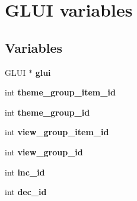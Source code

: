 \hypertarget{group___g_l_u_i___v_a_r_i_a_b_l_e_s}{\section{G\-L\-U\-I variables}
\label{group___g_l_u_i___v_a_r_i_a_b_l_e_s}
}
\subsection*{Variables}
\begin{DoxyCompactItemize}
\item 
\hypertarget{group___g_l_u_i___v_a_r_i_a_b_l_e_s_gab9d60a234f3204b269616cd65d6365a7}{G\-L\-U\-I $\ast$ {\bfseries glui}}\label{group___g_l_u_i___v_a_r_i_a_b_l_e_s_gab9d60a234f3204b269616cd65d6365a7}

\item 
\hypertarget{group___g_l_u_i___v_a_r_i_a_b_l_e_s_ga9cbd400ce6f3b08890a6409078083914}{int {\bfseries theme\-\_\-group\-\_\-item\-\_\-id}}\label{group___g_l_u_i___v_a_r_i_a_b_l_e_s_ga9cbd400ce6f3b08890a6409078083914}

\item 
\hypertarget{group___g_l_u_i___v_a_r_i_a_b_l_e_s_ga44d116ceeb353331a9e402c0a2d085fe}{int {\bfseries theme\-\_\-group\-\_\-id}}\label{group___g_l_u_i___v_a_r_i_a_b_l_e_s_ga44d116ceeb353331a9e402c0a2d085fe}

\item 
\hypertarget{group___g_l_u_i___v_a_r_i_a_b_l_e_s_ga696b9086cddd7aa0ee421a433d150484}{int {\bfseries view\-\_\-group\-\_\-item\-\_\-id}}\label{group___g_l_u_i___v_a_r_i_a_b_l_e_s_ga696b9086cddd7aa0ee421a433d150484}

\item 
\hypertarget{group___g_l_u_i___v_a_r_i_a_b_l_e_s_gaba64c272fa10fe04644f939a7e81d965}{int {\bfseries view\-\_\-group\-\_\-id}}\label{group___g_l_u_i___v_a_r_i_a_b_l_e_s_gaba64c272fa10fe04644f939a7e81d965}

\item 
\hypertarget{group___g_l_u_i___v_a_r_i_a_b_l_e_s_ga7be1f4f26aceb3fb47ebfce6c6bf2dfb}{int {\bfseries inc\-\_\-id}}\label{group___g_l_u_i___v_a_r_i_a_b_l_e_s_ga7be1f4f26aceb3fb47ebfce6c6bf2dfb}

\item 
\hypertarget{group___g_l_u_i___v_a_r_i_a_b_l_e_s_gad70b78ec82b6928c8655e6a5c129cdc3}{int {\bfseries dec\-\_\-id}}\label{group___g_l_u_i___v_a_r_i_a_b_l_e_s_gad70b78ec82b6928c8655e6a5c129cdc3}


\end{DoxyCompactItemize}
